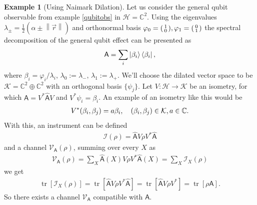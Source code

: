 \documentclass[a4paper,12pt]{wihuri}
\theoremstyle{definition}
\newtheorem{example}{Example}
\numberwithin{definition}{section}
\numberwithin{example}{section}
\numberwithin{theorem}{section}
\numberwithin{proposition}{section}
\numberwithin{lemma}{section}
\newcommand{\I}{\mathcal{I}}%
\newcommand{\hi}{\mathcal{H}}%
\newcommand{\ki}{\mathcal{K}}%
\newcommand{\V}{\mathcal{V}}%
\newcommand{\A}{\mathsf{A}}%
\newcommand{\cc}{\mathbb{C}^2}%
\DeclareMathOperator{\tr}{tr}
\newcommand{\norm}[1]{\left\lVert#1\right\rVert}
\newenvironment{psmallmatrix}
  {\left(\begin{smallmatrix}}
  {\end{smallmatrix}\right)}
\begin{document}
\begin{example}[Using Naimark Dilation]%
Let us consider the general qubit observable from example \ref{qubitobs} in $\hi = \cc$. Using the eigenvalues $\lambda_\pm = \frac{1}{2}(\alpha \pm \norm{\vec{r}})$ and orthonormal basis $\varphi_0 = \begin{psmallmatrix}
1 \\
0
\end{psmallmatrix} , \varphi_1 = \begin{psmallmatrix}
0 \\
1
\end{psmallmatrix}$
the spectral decomposition of the general qubit effect can be presented as 
\begin{align*}
\A = \sum_i \ket{\beta_i}\bra{\beta_i},
\end{align*}
where $\beta_i = \varphi_i / \lambda_i,\, \lambda_0 :=\lambda_{-},\, \lambda_1 := \lambda_{+}$. We'll choose the dilated vector space to be $\ki =\cc \oplus \cc$ with an orthogonal basis $\lbrace\psi_j\rbrace$. Let $V: \hi \rightarrow \ki$ be an isometry, for which $\A = V^*\hat{\A}V$ and $V^*\psi_i = \beta_i$. An example of an isometry like this would be
\begin{align*}
V^*(\beta_i, \beta_j) = a\beta_i,\quad (\beta_i, \beta_j) \in \ki, a \in \mathbb{C}\text.
\end{align*}
With this, an instrument can be defined
\begin{align*}
\I(\rho) = \hat{\A}V\rho V^*\hat{\A}
\end{align*}
and a channel $\V_\A(\rho)$, summing over every $X$ as 
\begin{align*}
\V_\A(\rho) = \sum_X \hat{\A}(X) V\rho V^*\hat{\A}(X) = \sum_X \I_X(\rho)
\end{align*}
we get
\begin{align*}
\tr[\I_X(\rho)] = \tr[\hat{\A} V \rho V^* \hat{\A}] = \tr[\hat{\A} V \rho V^*] = \tr[\rho \A]\text{.}
\end{align*}
So there exists a channel $\V_\A$ compatible with $\A$.
\end{example}




\end{document}
